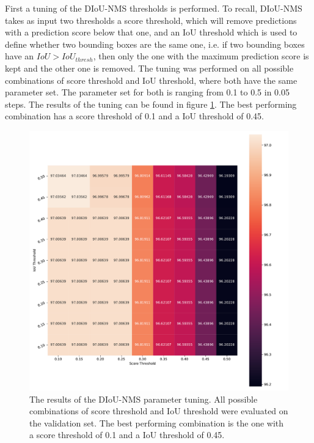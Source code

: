 First a tuning of the \ac{DIoU}-\ac{NMS} thresholds is performed.
To recall, \ac{DIoU}-\ac{NMS} takes as input two thresholds a score threshold, which will remove predictions with a prediction score below that one, and an \ac{IoU} threshold which is used to define whether two bounding boxes are the same one, i.e. if two bounding boxes have an $IoU > IoU_{thresh}$, then only the one with the maximum prediction score is kept and the other one is removed.
The tuning was performed on all possible combinations of score threshold and \ac{IoU} threshold, where both have the same parameter set.
The parameter set for both is ranging from 0.1 to 0.5 in 0.05 steps.
The results of the tuning can be found in figure \ref{fig:diou_nms_tuning}.
The best performing combination has a score threshold of 0.1 and a \ac{IoU} threshold of 0.45.

\begin{figure}
\begin{center}
    \includegraphics[width=\columnwidth]{imgs/yolo_diou_heat.pdf}
    \caption{The results of the \ac{DIoU}-\ac{NMS} parameter tuning. All possible combinations of score threshold and \ac{IoU} threshold were evaluated on the validation set. The best performing combination is the one with a score threshold of 0.1 and a \ac{IoU} threshold of 0.45.}
    \label{fig:diou_nms_tuning}
\end{center}
\end{figure}

